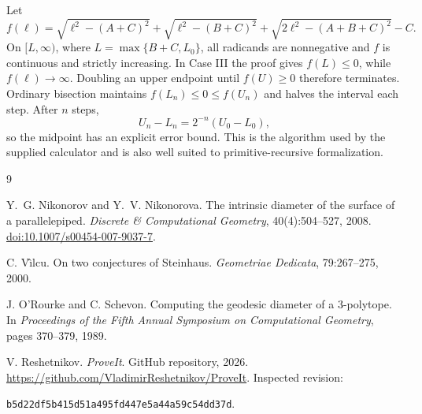 \documentclass[11pt]{article}
\theoremstyle{definition}
\begin{document}
Let
\[
 f(\ell)=\sqrt{\ell^2-(A+C)^2}+\sqrt{\ell^2-(B+C)^2}
 +\sqrt{2\ell^2-(A+B+C)^2}-C.
\]
On $[L,\infty)$, where $L=\max\{B+C,L_0\}$, all radicands are nonnegative and
$f$ is continuous and strictly increasing.  In Case III the proof gives
$f(L)\le0$, while $f(\ell)\to\infty$.  Doubling an upper endpoint until
$f(U)\ge0$ therefore terminates.  Ordinary bisection maintains
$f(L_n)\le0\le f(U_n)$ and halves the interval each step.  After $n$ steps,
\[
  U_n-L_n=2^{-n}(U_0-L_0),
\]
so the midpoint has an explicit error bound.  This is the algorithm used by
the supplied calculator and is also well suited to primitive-recursive
formalization.

\begin{thebibliography}{9}

Y.~G. Nikonorov and Y.~V. Nikonorova.
\newblock The intrinsic diameter of the surface of a parallelepiped.
\newblock \emph{Discrete \& Computational Geometry}, 40(4):504--527, 2008.
\newblock \href{https://doi.org/10.1007/s00454-007-9037-7}{doi:10.1007/s00454-007-9037-7}.

C. V\^{\i}lcu.
\newblock On two conjectures of Steinhaus.
\newblock \emph{Geometriae Dedicata}, 79:267--275, 2000.

J. O'Rourke and C. Schevon.
\newblock Computing the geodesic diameter of a 3-polytope.
\newblock In \emph{Proceedings of the Fifth Annual Symposium on Computational
Geometry}, pages 370--379, 1989.

V. Reshetnikov.
\newblock \emph{ProveIt}. GitHub repository, 2026.
\newblock \url{https://github.com/VladimirReshetnikov/ProveIt}.
\newblock Inspected revision:\par
\nolinkurl{b5d22df5b415d51a495fd447e5a44a59c54dd37d}.

\end{thebibliography}
\end{document}

